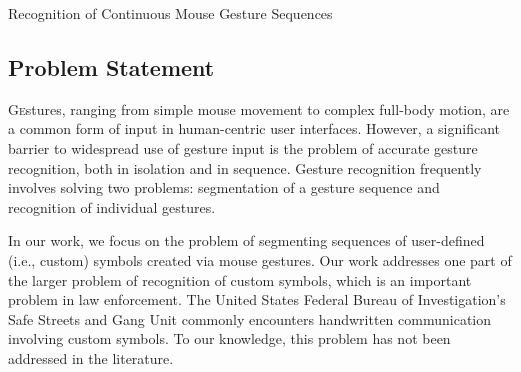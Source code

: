 \documentclass[twoside]{article}
\begin{document}
\centerline{Recognition of Continuous Mouse Gesture Sequences}
\normalsize


\begin{multicols}{2} %

\section{Problem Statement}

\lettrine[nindent=0em,lines=2]{G}estures, ranging from simple mouse movement to
complex full-body motion, are a common form of input in human-centric user
interfaces\cite{mitra_gesture_2007}. However, a significant barrier to
widespread use of gesture input is the problem of accurate gesture recognition,
both in isolation and in sequence. Gesture recognition frequently involves
solving two problems: segmentation of a gesture sequence and recognition of
individual gestures.

In our work, we focus on the problem of segmenting sequences of user-defined (i.e., custom)
symbols created via mouse gestures. Our work addresses one part of the larger
problem of recognition of custom symbols, which is an important problem in law
enforcement. The United States Federal Bureau of Investigation's Safe Streets
and Gang Unit commonly encounters handwritten communication involving custom
symbols\cite{lyddane_donald_united_2006}. To our knowledge, this problem has not
been addressed in the literature.


\begin{comment}
Our work addresses one part of the larger problem of recognition of custom handwritten symbols, which according to law enforcement is a common medium of communication among gangs\cite{lyddane_donald_united_2006}. To our
knowledge, designing a general-purpose ``symbol'' recognizer has not been addressed in the literature.
\end{comment}

\end{multicols}
\end{document}
